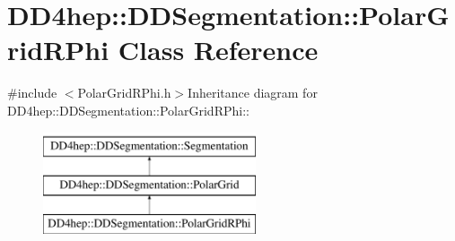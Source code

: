\hypertarget{class_d_d4hep_1_1_d_d_segmentation_1_1_polar_grid_r_phi}{
\section{DD4hep::DDSegmentation::PolarGridRPhi Class Reference}
\label{class_d_d4hep_1_1_d_d_segmentation_1_1_polar_grid_r_phi}
}


{\ttfamily \#include $<$PolarGridRPhi.h$>$}Inheritance diagram for DD4hep::DDSegmentation::PolarGridRPhi::\begin{figure}[H]
\begin{center}
\leavevmode
\includegraphics[height=3cm]{class_d_d4hep_1_1_d_d_segmentation_1_1_polar_grid_r_phi}
\end{center}
\end{figure}
